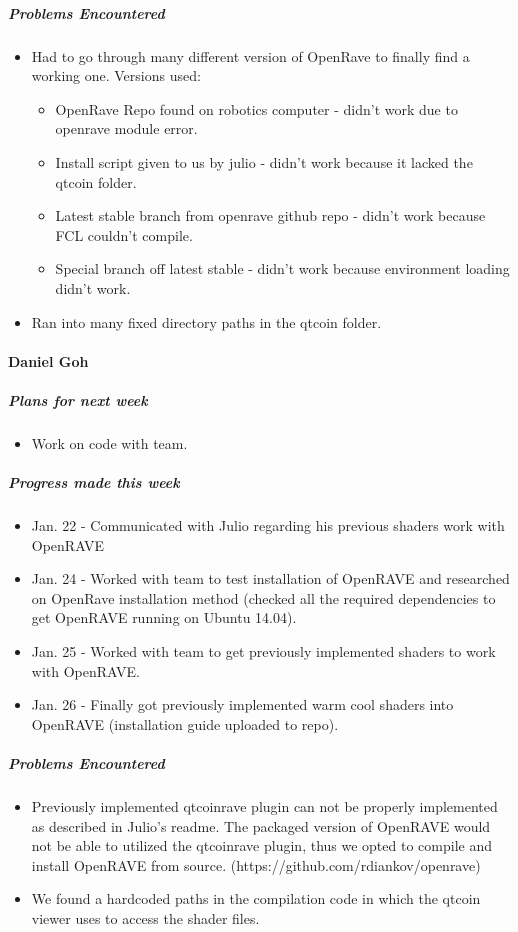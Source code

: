 {\subparagraph{Problems Encountered}
\begin{itemize}
  \item Had to go through many different version of OpenRave to finally find a working one. Versions used:
  \begin{itemize}
    \item OpenRave Repo found on robotics computer - didn't work due to openrave module error.
    \item Install script given to us by julio - didn't work because it lacked the qtcoin folder.
    \item Latest stable branch from openrave github repo - didn't work because FCL couldn't compile.
    \item Special branch off latest stable - didn't work because environment loading didn't work.
  \end{itemize}
  \item Ran into many fixed directory paths in the qtcoin folder.
\end{itemize}

\vspace{3mm}
\paragraph{Daniel Goh}
\subparagraph{Plans for next week}
\begin{itemize}
  \item Work on code with team.
\end{itemize}

\subparagraph{Progress made this week}
\begin{itemize}
  \item Jan. 22 - Communicated with Julio regarding his previous shaders work with OpenRAVE
  \item Jan. 24 - Worked with team to test installation of OpenRAVE and researched on OpenRave installation method (checked all the required dependencies to get OpenRAVE running on Ubuntu 14.04).
  \item Jan. 25 - Worked with team to get previously implemented shaders to work with OpenRAVE.
  \item Jan. 26 - Finally got previously implemented warm cool shaders into OpenRAVE (installation guide uploaded to repo).
\end{itemize}

\subparagraph{Problems Encountered}
\begin{itemize}
  \item Previously implemented qtcoinrave plugin can not be properly implemented as described in Julio's readme. The packaged version of OpenRAVE would not be able to utilized the qtcoinrave plugin, thus we opted to compile and install OpenRAVE from source. (https://github.com/rdiankov/openrave)
  \item We found a hardcoded paths in the compilation code in which the qtcoin viewer uses to access the shader files.
\end{itemize}

}

